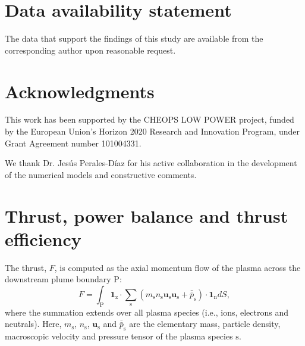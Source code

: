 \documentclass[%
 aip,
cha,
 amsmath,amssymb,
 reprint,%
]{revtex4-1}
\begin{document}
\section*{Data availability statement}

The data that support the findings of this study are available
from the corresponding author upon reasonable request.


\section*{Acknowledgments}

This work has been supported by the CHEOPS LOW POWER project, funded by the European Union’s Horizon 2020 Research and Innovation Program, under Grant Agreement number 101004331.

We thank Dr. Jesús Perales-Díaz for his active collaboration in the development of the numerical models and constructive comments.


\appendix


\renewcommand{\theequation}{\thesection.\arabic{equation}}
\renewcommand\thefigure{\thesection.\arabic{figure}}  
\renewcommand\thetable{\thesection.\arabic{table}}  



\section{Thrust, power balance and thrust efficiency}
\label{sec: App balances}

The thrust, $F$, is computed as the axial momentum flow of the plasma across the downstream plume boundary P:
\begin{equation}
    F = \int_\mathrm{P}\bm 1_\mathrm{z}\cdot \sum_\mathrm{s}\left(m_\mathrm{s}n_\mathrm{s}\bm{u}_\mathrm{s}\bm{u}_\mathrm{s} + \bar{\bar{p}}_\mathrm{s}\right)\cdot\bm 1_\mathrm{n}dS,
\end{equation}
where the summation extends over all plasma species (i.e., ions, electrons and neutrals). Here, $m_\mathrm{s}$, $n_\mathrm{s}$, $\bm u_\mathrm{s}$ and $\bar{\bar{p}}_\mathrm{s}$ are the elementary mass, particle density, macroscopic velocity and pressure tensor of the plasma species $\mathrm{s}$.
\end{document}
